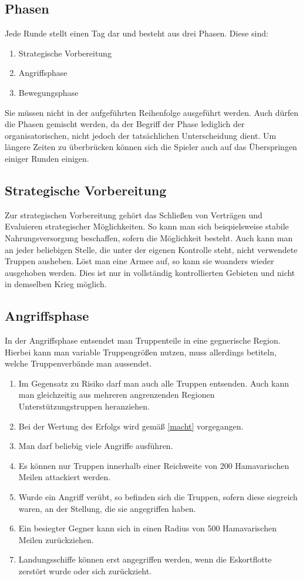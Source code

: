 \documentclass{article}
\begin{document}
\subsection{Phasen}
Jede Runde stellt einen Tag dar und besteht aus drei Phasen. Diese sind:
\begin{enumerate}
	\item Strategische Vorbereitung
	\item Angriffsphase
	\item Bewegungsphase
\end{enumerate}
Sie müssen nicht in der aufgeführten Reihenfolge ausgeführt werden. Auch dürfen die Phasen gemischt werden, da der Begriff
der Phase lediglich der organisatorischen, nicht jedoch der tatsächlichen Unterscheidung dient. Um längere Zeiten zu überbrücken können sich die Spieler auch auf das Überspringen einiger Runden einigen.

\subsection{Strategische Vorbereitung}
Zur strategischen Vorbereitung gehört das Schließen von Verträgen und Evaluieren strategischer Möglichkeiten. So kann man
sich beispielsweise stabile Nahrungsversorgung beschaffen, sofern die Möglichkeit besteht. Auch kann man an jeder beliebigen Stelle, die unter der eigenen Kontrolle steht, nicht verwendete Truppen ausheben. Löst man eine Armee auf, so kann sie woanders wieder ausgehoben werden. Dies ist nur in vollständig kontrollierten Gebieten und nicht in demselben Krieg möglich.

\subsection{Angriffsphase}
In der Angriffsphase entsendet man Truppenteile in eine gegnerische Region. Hierbei kann man variable Truppengrößen nutzen, muss
allerdings betiteln, welche Truppenverbände man aussendet. 
\begin{enumerate}[(1)]
	\item Im Gegensatz zu Risiko darf man auch alle Truppen entsenden. Auch kann man gleichzeitig aus mehreren angrenzenden Regionen Unterstützungstruppen heranziehen.
	\item Bei der Wertung des Erfolgs wird gemäß \ref{macht} vorgegangen.
	\item Man darf beliebig viele Angriffe ausführen.
	\item Es können nur Truppen innerhalb einer Reichweite von 200 Hamavarischen Meilen attackiert werden.
	\item Wurde ein Angriff verübt, so befinden sich die Truppen, sofern diese siegreich waren, an der Stellung, die sie angegriffen haben.
	\item Ein besiegter Gegner kann sich in einen Radius von 500 Hamavarischen Meilen zurückziehen.
	\item Landungsschiffe können erst angegriffen werden, wenn die Eskortflotte zerstört wurde oder sich zurückzieht.
\end{enumerate}
\end{document}
